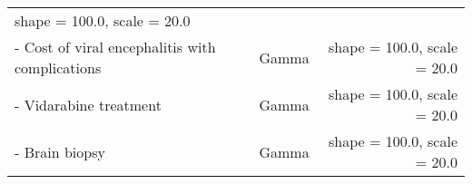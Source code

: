 \documentclass[
]{article}
\begin{document}
\begin{longtable}[]{@{}lrr@{}}
\begin{minipage}[t]{0.39\columnwidth}
shape = 100.0, scale = 20.0\strut
\end{minipage}\tabularnewline
\begin{minipage}[t]{0.34\columnwidth}\raggedright
- Cost of viral encephalitis with complications\strut
\end{minipage} & \begin{minipage}[t]{0.18\columnwidth}\raggedleft
Gamma\strut
\end{minipage} & \begin{minipage}[t]{0.39\columnwidth}\raggedleft
shape = 100.0, scale = 20.0\strut
\end{minipage}\tabularnewline
\begin{minipage}[t]{0.34\columnwidth}\raggedright
- Vidarabine treatment\strut
\end{minipage} & \begin{minipage}[t]{0.18\columnwidth}\raggedleft
Gamma\strut
\end{minipage} & \begin{minipage}[t]{0.39\columnwidth}\raggedleft
shape = 100.0, scale = 20.0\strut
\end{minipage}\tabularnewline
\begin{minipage}[t]{0.34\columnwidth}\raggedright
- Brain biopsy\strut
\end{minipage} & \begin{minipage}[t]{0.18\columnwidth}\raggedleft
Gamma\strut
\end{minipage} & \begin{minipage}[t]{0.39\columnwidth}\raggedleft
shape = 100.0, scale = 20.0\strut
\end{minipage}\tabularnewline
\bottomrule
\end{longtable}
\end{document}
